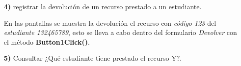 \documentclass[12pt]{article}
\begin{document}
\begin{itemize}
\item[\textbf{4)}] registrar la devolución de un recurso prestado a un estudiante.
\begin{center}
\end{center}
En las pantallas se muestra la devolución el recurso con \textit{código 123} del \textit{estudiante 132465789}, esto se lleva a cabo dentro del formulario \textit{Devolver} con el método \textbf{Button1Click()}.  




\item[\textbf{5)}] Consultar ¿Qué estudiante tiene prestado el recurso Y?.


\end{itemize}
\end{document}
